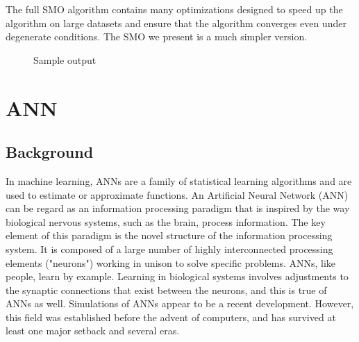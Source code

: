 \documentclass[11pt,letterpaper]{article}
\begin{document}
The full SMO algorithm contains many optimizations designed to speed up the algorithm on large datasets and ensure that the algorithm converges even under degenerate conditions. The SMO we present is a much simpler version.




\begin{figure}
\caption{Sample output}
\label{fig:intro}
\end{figure}
\section{ANN}

\subsection{Background}

In machine learning, ANNs are a family of statistical learning algorithms and are used to estimate or approximate functions. An Artificial Neural Network (ANN) can be regard as an information processing paradigm that is inspired by the way biological nervous systems, such as the brain, process information.  The key element of this paradigm is the novel structure of the information processing system. It is composed of a large number of highly interconnected processing elements ("neurons") working in unison to solve specific problems. ANNs, like people, learn by example. Learning in biological systems involves adjustments to the synaptic connections that exist between the neurons, and this is true of ANNs as well. Simulations of ANNs appear to be a recent development. However, this field was established before the advent of computers, and has survived at least one major setback and several eras.
\end{document}

